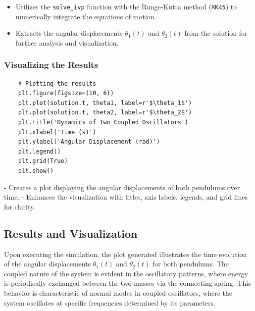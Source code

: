 \documentclass[12pt]{report} %
\begin{document}
    
    
    \begin{itemize}
        \item Utilizes the \texttt{solve\_ivp} function with the Runge-Kutta method (\texttt{RK45}) to numerically integrate the equations of motion.
        \item Extracts the angular displacements \( \theta_1(t) \) and \( \theta_2(t) \) from the solution for further analysis and visualization.
    \end{itemize}
    
    \subsubsection{Visualizing the Results}
    
    \begin{verbatim}
    # Plotting the results
    plt.figure(figsize=(10, 6))
    plt.plot(solution.t, theta1, label=r'$\theta_1$')
    plt.plot(solution.t, theta2, label=r'$\theta_2$')
    plt.title('Dynamics of Two Coupled Oscillators')
    plt.xlabel('Time (s)')
    plt.ylabel('Angular Displacement (rad)')
    plt.legend()
    plt.grid(True)
    plt.show()
    \end{verbatim}
    
    - Creates a plot displaying the angular displacements of both pendulums over time.
    - Enhances the visualization with titles, axis labels, legends, and grid lines for clarity.
    
    \subsection{Results and Visualization}
    \label{subsec:part1_task1_results}
    
    Upon executing the simulation, the plot generated illustrates the time evolution of the angular displacements \( \theta_1(t) \) and \( \theta_2(t) \) for both pendulums. The coupled nature of the system is evident in the oscillatory patterns, where energy is periodically exchanged between the two masses via the connecting spring. This behavior is characteristic of normal modes in coupled oscillators, where the system oscillates at specific frequencies determined by its parameters.
    
\end{document}
